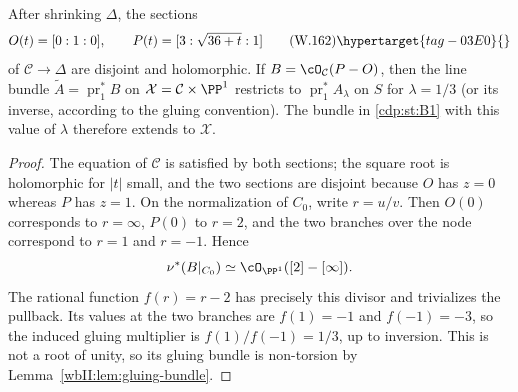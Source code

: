 \begin{lemma}
\hypertarget{tag-03I9}{}\label{wbII:lem:extending-gluing}

After shrinking $\Delta$, the sections
\[
 O(t)=[0:1:0],\qquad
 P(t)=[3:\sqrt{36+t}:1]
\tag{W.162}\hypertarget{tag-03E0}{}\label{wbII:eq:CN:4.5a}
\]
of $\mathcal C\to\Delta$ are disjoint and holomorphic.  If
$B=\cO_{\mathcal C}(P-O)$, then the line bundle
$\widetilde A=\operatorname{pr}_1^*B$ on $\mathcal X=\mathcal C\times\PP^1$
restricts to $\operatorname{pr}_1^*A_{\lambda}$ on $S$ for
$\lambda=1/3$ (or its inverse, according to the gluing convention).  The bundle in
\cref{cdp:st:B1} with this value of $\lambda$ therefore extends to
$\mathcal X$.
\end{lemma}



\begin{proof}
The equation of $\mathcal C$ is satisfied by both sections; the square root
is holomorphic for $|t|$ small, and the two sections are disjoint because
$O$ has $z=0$ whereas $P$ has $z=1$.  On the normalization of $C_0$, write
$r=u/v$.  Then $O(0)$ corresponds to $r=\infty$, $P(0)$ to $r=2$, and the
two branches over the node correspond to $r=1$ and $r=-1$.  Hence
\[
 \nu^*(B|_{C_0})\simeq\cO_{\PP^1}([2]-[\infty]).
\]
The rational function $f(r)=r-2$ has precisely this divisor and trivializes
the pullback.  Its values at the two branches are $f(1)=-1$ and
$f(-1)=-3$, so the induced gluing multiplier is $f(1)/f(-1)=1/3$,
up to inversion.  This is not a root of unity, so its gluing bundle is non-torsion by
Lemma~\ref{wbII:lem:gluing-bundle}.

\end{proof}